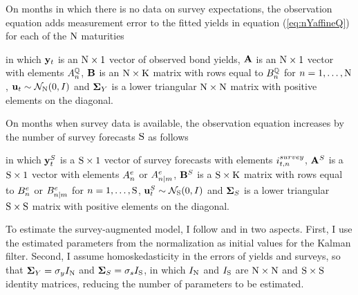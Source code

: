 {On months in which there is no data on survey expectations, the observation equation adds measurement error to the fitted yields in equation (\ref{eq:nYaffineQ}) for each of the \(\mathrm{N}\) maturities
	
\noindent in which \(\mathbf{y}_{t}\) is an \(\mathrm{N} \times 1\) vector of observed bond yields, \(\mathbf{A}\) is an \(\mathrm{N} \times 1\) vector with elements \(A_{n}^{\mathbb{Q}}\), \(\mathbf{B}\) is an \(\mathrm{N} \times \mathrm{K}\) matrix with rows equal to \(B_{n}^{\mathbb{Q}}\) for \(n = 1, \ldots, \mathrm{N}\), \(\mathbf{u}_{t} \sim \mathcal{N}_{\mathrm{N}} (0,I) \) and \(\mathbf{\mathbf{\Sigma}}_{Y}\) is a lower triangular \(\mathrm{N} \times \mathrm{N}\) matrix with positive elements on the diagonal.

On months when survey data is available, the observation equation increases by the number of survey forecasts \(\mathrm{S}\) as follows
	
\noindent in which \(\mathbf{y}_{t}^{S}\) is a \(\mathrm{S} \times 1\) vector of survey forecasts with elements \(i_{t,n}^{survey}\), \(\mathbf{A}^{S}\) is a \(\mathrm{S} \times 1\) vector with elements \(A_{n}^{e}\) or \(A_{n | m}^{e}\), \(\mathbf{B}^{S}\) is a \(\mathrm{S} \times \mathrm{K}\) matrix with rows equal to \(B_{n}^{e}\) or \(B_{n | m}^{e}\) for \(n = 1, \ldots, \mathrm{S}\), \(\mathbf{u}_{t}^{S} \sim \mathcal{N}_{\mathrm{S}} (0,I) \) and \(\mathbf{\mathbf{\Sigma}}_{S}\) is a lower triangular \(\mathrm{S} \times \mathrm{S}\) matrix with positive elements on the diagonal.

To estimate the survey-augmented model, I follow \cite{Guimaraes:2014} and \cite{Lloyd:2020} in two aspects. First, I use the estimated parameters from the \cite{JSZ:2011} normalization as initial values for the Kalman filter.
Second, I assume homoskedasticity in the errors of yields and surveys, so that \(\mathbf{\mathbf{\Sigma}}_{Y} = \sigma_y I_{\mathrm{N}}\) and \(\mathbf{\mathbf{\Sigma}}_{S} = \sigma_s I_{\mathrm{S}}\), in which \(I_{\mathrm{N}}\) and \(I_{\mathrm{S}}\) are \(\mathrm{N} \times \mathrm{N}\) and \(\mathrm{S} \times \mathrm{S}\) identity matrices, %
reducing the number of parameters to be estimated.

}
